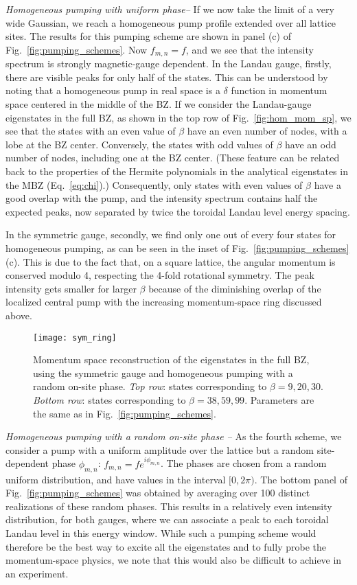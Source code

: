 \documentclass[twocolumn, 10pt, aps, superscriptaddress, floatfix, showpacs, pra, citeautoscript]{revtex4-1}
\begin{document}
{\em{Homogeneous pumping with uniform phase--}} If we now take the limit of a very wide Gaussian, we reach a homogeneous pump profile extended over all lattice sites. The results for this pumping scheme are shown in panel (c) of
Fig.~\ref{fig:pumping_schemes}. Now $f_{m,n} = f$, and we see that the intensity spectrum is strongly magnetic-gauge dependent. In the Landau gauge, firstly, there are visible peaks for only
half of the states. This can be understood by noting that a homogeneous pump in real space is a $\delta$ function in momentum space centered in the
middle of the BZ. If we consider the Landau-gauge eigenstates in the full BZ, as shown
in the top row of Fig.~\ref{fig:hom_mom_sp}, we see that the states with an even
value of $\beta$ have an even number of nodes, with a lobe at the BZ
center. Conversely, the states with odd values of $\beta$ have an odd number of nodes, including one at the BZ center. (These feature can be related back to the properties of the Hermite polynomials in the analytical eigenstates in the MBZ (Eq.~\eqref{eq:chi}).) Consequently, only states with even values of $\beta$ have a good overlap with the pump, and the intensity spectrum contains half the expected peaks, now separated by twice the toroidal Landau level energy spacing.  

In the symmetric gauge, secondly, we find only one out of every four
states for homogeneous pumping, as can be seen in the inset of Fig.~\ref{fig:pumping_schemes}
(c). This is due to the fact that, on a square lattice, the angular
momentum is conserved modulo 4, respecting the 4-fold rotational
symmetry. The peak intensity gets smaller for larger $\beta$ because
of the diminishing overlap of the localized central pump with the
increasing momentum-space ring discussed above.

\begin{figure}[tb]
  \centering
  \texttt{[image: sym\_ring]} %
  \caption{Momentum space reconstruction of the eigenstates in the
    full BZ, using the symmetric gauge and homogeneous pumping with a random on-site
    phase. \emph{Top row}: states corresponding to
    $\beta = 9, 20, 30$.  \emph{Bottom row}: states corresponding to
    $\beta = 38, 59, 99$. Parameters are the same as in Fig.~\ref{fig:pumping_schemes}.}
  \label{fig:torus_edge}
\end{figure}


{\em{Homogeneous pumping with a random on-site phase --}} As the fourth scheme, we consider a pump with a uniform amplitude over the lattice but a random site-dependent phase $\phi_{m,n}$:
$f_{m,n}=fe^{i\phi_{m,n}}$. The phases are chosen from a random
uniform distribution, and have values in the interval $[0,2\pi)$. The
bottom panel of Fig.~\ref{fig:pumping_schemes} was obtained by
averaging over 100 distinct realizations of these random phases. This
results in a relatively even intensity distribution, for both gauges, where we can associate a peak to each toroidal Landau level in this energy window. While such a pumping scheme would therefore be the best way to excite all the eigenstates and to fully probe the momentum-space physics, we note that this would also be difficult to achieve in an experiment.
\end{document}
